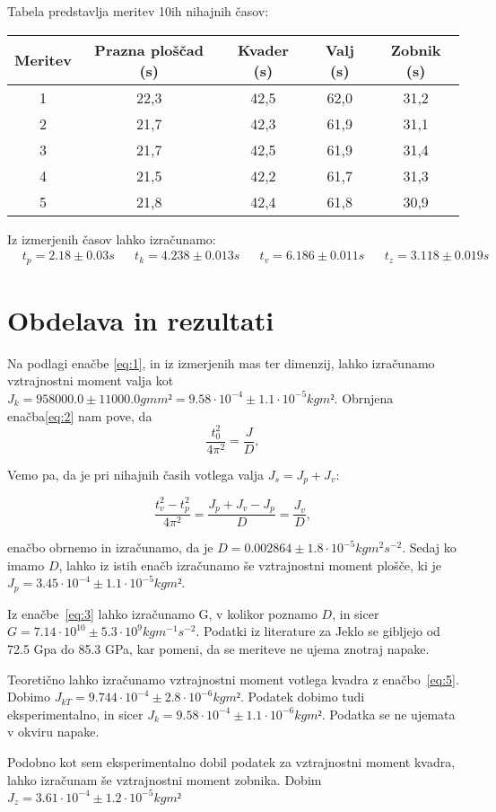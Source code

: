 \documentclass{article}
\begin{document}
Tabela predstavlja meritev 10ih nihajnih časov:  \\
\begin{center}
\begin{tabular}{c|c|c|c|c}
Meritev & Prazna ploščad (s) & Kvader (s) & Valj (s) & Zobnik (s) \\
\hline
1 & 22,3 & 42,5 & 62,0 & 31,2 \\
2 & 21,7 & 42,3 & 61,9 & 31,1 \\
3 & 21,7 & 42,5 & 61,9 & 31,4 \\
4 & 21,5 & 42,2 & 61,7 & 31,3 \\
5 & 21,8 & 42,4 & 61,8 & 30,9
\end{tabular}
\end{center}

Iz izmerjenih časov lahko izračunamo:
\begin{align*}
  &t_{p} = 2.18 \pm 0.03 s && t_{k} = 4.238 \pm 0.013 s && t_{v} = 6.186 \pm 0.011 s &&  t_{z} = 3.118 \pm 0.019 s
\end{align*}

\section{Obdelava in rezultati}

Na podlagi enačbe \ref{eq:1}, in iz izmerjenih mas ter dimenzij, lahko izračunamo vztrajnostni moment valja kot \( J_{k} = 958000.0 \pm 11000.0 g mm² = 9.58 \cdot 10^{-4} \pm 1.1 \cdot 10^{-5}  kg m² \). Obrnjena enačba\ref{eq:2} nam pove, da
\begin{equation*}
  \frac{t_{0}^{2}  }{4 \pi^{2} } = \frac{J}{D},
\end{equation*}

Vemo pa, da je pri nihajnih časih votlega valja \( J_{s} = J_{p} + J_{v}  \):

\begin{equation*}
\frac{t_{v}^{2} - t_{p}^{2} }{4 \pi^{2} }  = \frac{J_{p}+J_{v}-J_{p} }{D} = \frac{J_{v} }{D},
\end{equation*}

enačbo obrnemo in izračunamo, da je \( D = 0.002864 \pm 1.8 \cdot 10^{-5} kg m^{2}  s^{-2}  \). Sedaj ko imamo \( D \), lahko iz istih enačb izračunamo še vztrajnostni moment plošče, ki je
\( J_{p} = 3.45 \cdot 10^{-4}  \pm 1.1 \cdot 10^{-5}  kg m² \).

Iz enačbe~\ref{eq:3} lahko izračunamo G, v kolikor poznamo \( D \), in sicer \( G = 7.14 \cdot 10^{10}  \pm 5.3 \cdot 10^{9}  kg m^{-1}  s^{-2}  \). Podatki iz literature za Jeklo se gibljejo od 72.5 Gpa do 85.3 GPa, kar pomeni, da se meriteve ne ujema znotraj napake.

Teoretično lahko izračunamo vztrajnostni moment votlega kvadra z enačbo~\ref{eq:5}. Dobimo \( J_{kT} = 9.744 \cdot 10^{-4}  \pm 2.8 \cdot 10^{-6}  kg m² \). Podatek dobimo tudi eksperimentalno, in sicer \( J_{k} = 9.58 \cdot 10^{-4} \pm 1.1 \cdot 10^{-6}  kg m²  \). Podatka se ne ujemata v okviru napake.

Podobno kot sem eksperimentalno dobil podatek za vztrajnostni moment kvadra, lahko izračunam še vztrajnostni moment zobnika. Dobim \( J_{z} = 3.61 \cdot 10^{-4}  \pm 1.2 \cdot 10^{-5}  kg m² \)
\end{document}
